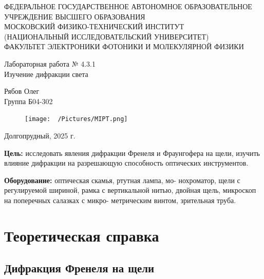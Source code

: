\documentclass[a4paper,12pt]{article} %
\begin{document}
\begin{center}
	\footnotesize{ФЕДЕРАЛЬНОЕ ГОСУДАРСТВЕННОЕ АВТОНОМНОЕ ОБРАЗОВАТЕЛЬНОЕ 			УЧРЕЖДЕНИЕ ВЫСШЕГО ОБРАЗОВАНИЯ}\\
	\footnotesize{МОСКОВСКИЙ ФИЗИКО-ТЕХНИЧЕСКИЙ ИНСТИТУТ\\(НАЦИОНАЛЬНЫЙ 			ИССЛЕДОВАТЕЛЬСКИЙ УНИВЕРСИТЕТ)}\\
	\footnotesize{ФАКУЛЬТЕТ ЭЛЕКТРОНИКИ ФОТОНИКИ И МОЛЕКУЛЯРНОЙ ФИЗИКИ\\}
	\hfill \break
	\hfill \break
	\hfill \break
	\hfill \break
\end{center}




\begin{center}   
    \hfill \break
	\hfill \break
	\hfill \break
	\large{Лабораторная работа № 4.3.1\\ \hfill \break\Large{Изучение дифракции света}}\\
	\hfill \break
	\hfill \break
	\hfill \break
	\hfill \break
	\begin{flushright}
		Рябов Олег\\
		Группа Б04-302
	\end{flushright}
	\hfill \break
	\hfill \break
	\hfill \break
\end{center}
\hfill \break
\begin{figure}[h]
	\centering
	\texttt{[image: ~/Pictures/MIPT.png]}
\end{figure}
\begin{center}
	Долгопрудный, 2025 г.
\end{center}
\thispagestyle{empty}

\newpage

\textbf{Цель:} исследовать явления дифракции Френеля и Фраунгофера на щели, изучить влияние дифракции на разрешающую способность оптических инструментов.


\textbf{Оборудование:} оптическая скамья, ртутная лампа, мо- нохроматор, щели с регулируемой шириной, рамка с вертикальной нитью, двойная щель, микроскоп на поперечных салазках с микро- метрическим винтом, зрительная труба.

\section{Теоретическая справка}
\subsection{Дифракция Френеля на щели}
\end{document}

